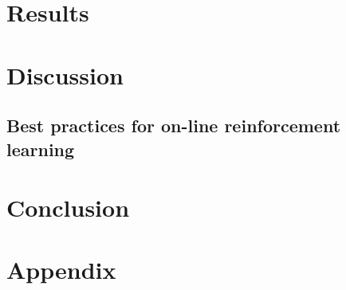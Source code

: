 \documentclass[sigconf]{acmart}
\begin{document}
\section{Results}

\section{Discussion}

\subsection{Best practices for on-line reinforcement learning}

\section{Conclusion}

\section*{Appendix}
\end{document}
